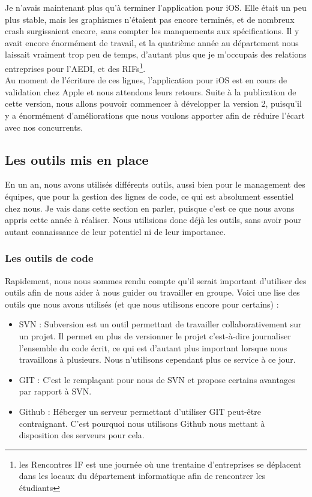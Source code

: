 \documentclass{article}
\begin{document}
		Je n'avais maintenant plus qu'à terminer l'application pour iOS. Elle était un peu plus stable, mais les graphismes n'étaient pas encore terminés, et de nombreux crash surgissaient encore, sans compter les manquements aux spécifications. Il y avait encore énormément de travail, et la quatrième année au département nous laissait vraiment trop peu de temps, d'autant plus que je m'occupais des relations entreprises pour l'AEDI, et des RIFs\footnote{les Rencontres IF est une journée où une trentaine d'entreprises se déplacent dans les locaux du département informatique afin de rencontrer les étudiants}. \\
		
		Au moment de l'écriture de ces lignes, l'application pour iOS est en cours de validation chez Apple et nous attendons leurs retours. Suite à la publication de cette version, nous allons pouvoir commencer à développer la version 2, puisqu'il y a énormément d'améliorations que nous voulons apporter afin de réduire l'écart avec nos concurrents. 
		
	\subsection{Les outils mis en place}
	En un an, nous avons utilisés différents outils, aussi bien pour le management des équipes, que pour la gestion des lignes de code, ce qui est absolument essentiel chez nous. Je vais dans cette section en parler, puisque c'est ce que nous avons appris cette année à réaliser. Nous utilisions donc déjà les outils, sans avoir pour autant connaissance de leur potentiel ni de leur importance.
		\subsubsection{Les outils de code}
		Rapidement, nous nous sommes rendu compte qu'il serait important d'utiliser des outils afin de nous aider à nous guider ou travailler en groupe. Voici une lise des outils que nous avons utilisés (et que nous utilisons encore pour certains) :
			\begin{itemize}
				\item SVN : Subversion est un outil permettant de travailler collaborativement sur un projet. Il permet en plus de versionner le projet c'est-à-dire journaliser l'ensemble du code écrit, ce qui est d'autant plus important lorsque nous travaillons à plusieurs. Nous n'utilisons cependant plus ce service à ce jour.
				\item GIT : C'est le remplaçant pour nous de SVN et propose certains avantages par rapport à SVN.
				\item Github : Héberger un serveur permettant d'utiliser GIT peut-être contraignant. C'est pourquoi nous utilisons Github nous mettant à disposition des serveurs pour cela. 
			\end{itemize}
		
\end{document}
